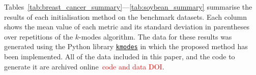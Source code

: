 Tables~\ref{tab:breast_cancer_summary}---\ref{tab:soybean_summary} summarise the
results of each initialisation method on the benchmark datasets. Each column
shows the mean value of each metric and its standard deviation in parentheses
over  repetitions of the \(k\)-modes algorithm. The
data for these results was generated using the Python library
\href{https://github.com/nicodv/kmodes}{\texttt{kmodes}} in which the proposed
method has been implemented. All of the data included in this paper, and the
code to generate it are archived online~\textcolor{red}{code and data DOI}.

\begin{table}
    \centering
    \resizebox{\textwidth}{!}{%
        
    }
    \label{tab:breast_cancer_summary}\vspace{20pt}

    \resizebox{\textwidth}{!}{%
        
    }
    \label{tab:mushroom_summary}\vspace{20pt}

    \resizebox{\textwidth}{!}{%
        
    }
    \label{tab:soybean_summary}\vspace{20pt}
\end{table}
